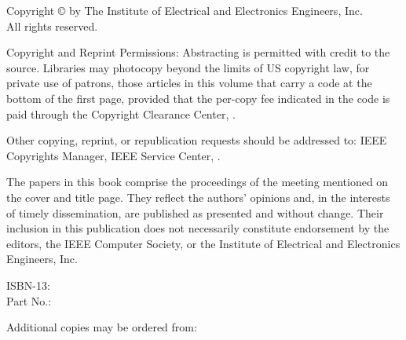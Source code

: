 
\cleardoublepage
\thispagestyle{empty}

{\small
\begin{center}
Copyright \copyright{} \the\year{}
by The Institute of Electrical and Electronics Engineers, Inc.\\
All rights reserved.
\end{center}

Copyright and Reprint Permissions: Abstracting is permitted with credit to the source. Libraries may photocopy beyond the limits of US copyright law, for private use of patrons, those articles in this volume that carry a code at the bottom of the first page, provided that the per-copy fee indicated in the code is paid through the Copyright Clearance Center,
.

Other copying, reprint, or republication requests should be addressed to: IEEE Copyrights Manager, IEEE Service Center,
.

The papers in this book comprise the proceedings of the meeting mentioned on the cover and title page. They reflect the authors’ opinions and, in the interests of timely dissemination, are published as presented and without change. Their inclusion in this publication does not necessarily constitute endorsement by the editors, the IEEE Computer Society, or the Institute of Electrical and Electronics Engineers, Inc.

\begin{center}
ISBN-13:  \\
Part No.: 
\end{center}

\begin{center}
Additional copies may be ordered from:
\end{center}

}
